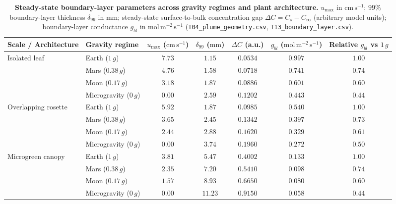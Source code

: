 \documentclass[10pt,twocolumn,a4paper]{article}
\newcommand{\cmsu}{\ensuremath{\mathrm{cm\,s^{-1}}}}
\newcommand{\molms}{\ensuremath{\mathrm{mol\,m^{-2}\,s^{-1}}}}
\begin{document}
\begin{table}[tbp]
\caption{\textbf{Steady-state boundary-layer parameters across gravity regimes and plant architecture.}
$u_{\max}$ in $\cmsu$; $99\%$ boundary-layer thickness $\delta_{99}$ in $\mathrm{mm}$; steady-state surface-to-bulk concentration gap $\Delta C = C_s - C_{\infty}$ (arbitrary model units); boundary-layer conductance $g_{bl}$ in $\molms$ (\texttt{T04\_plume\_geometry.csv}, \texttt{T13\_boundary\_layer.csv}).}
\label{tab:cfd_sweep}
\centering
\footnotesize
\begin{tabular*}{\textwidth}{@{\extracolsep{\fill}}llccccc@{}}
\toprule
\textbf{Scale / Architecture} & \textbf{Gravity regime} & \textbf{$u_{\max}$ ($\cmsu$)} & \textbf{$\delta_{99}$ ($\mathrm{mm}$)} & \textbf{$\Delta C$ (a.u.)} & \textbf{$g_{bl}$ ($\molms$)} & \textbf{Relative $g_{bl}$ vs $1\,g$} \\
\midrule
\multirow{4}{*}{Isolated leaf}
 & Earth ($1\,g$) & $7.73$ & $1.15$ & $0.0534$ & $0.997$ & $1.00$ \\
 & Mars ($0.38\,g$) & $4.76$ & $1.58$ & $0.0718$ & $0.741$ & $0.74$ \\
 & Moon ($0.17\,g$) & $3.18$ & $1.87$ & $0.0886$ & $0.601$ & $0.60$ \\
 & Microgravity ($0\,g$) & $0.00$ & $2.59$ & $0.1202$ & $0.443$ & $0.44$ \\
\midrule
\multirow{4}{*}{Overlapping rosette}
 & Earth ($1\,g$) & $5.92$ & $1.87$ & $0.0985$ & $0.540$ & $1.00$ \\
 & Mars ($0.38\,g$) & $3.65$ & $2.45$ & $0.1342$ & $0.397$ & $0.73$ \\
 & Moon ($0.17\,g$) & $2.44$ & $2.88$ & $0.1620$ & $0.329$ & $0.61$ \\
 & Microgravity ($0\,g$) & $0.00$ & $3.74$ & $0.1960$ & $0.272$ & $0.50$ \\
\midrule
\multirow{4}{*}{Microgreen canopy}
 & Earth ($1\,g$) & $3.81$ & $5.47$ & $0.4002$ & $0.133$ & $1.00$ \\
 & Mars ($0.38\,g$) & $2.35$ & $7.20$ & $0.5410$ & $0.098$ & $0.74$ \\
 & Moon ($0.17\,g$) & $1.57$ & $8.93$ & $0.6650$ & $0.080$ & $0.60$ \\
 & Microgravity ($0\,g$) & $0.00$ & $11.23$ & $0.9150$ & $0.058$ & $0.44$ \\
\bottomrule
\end{tabular*}
\end{table}
\end{document}
